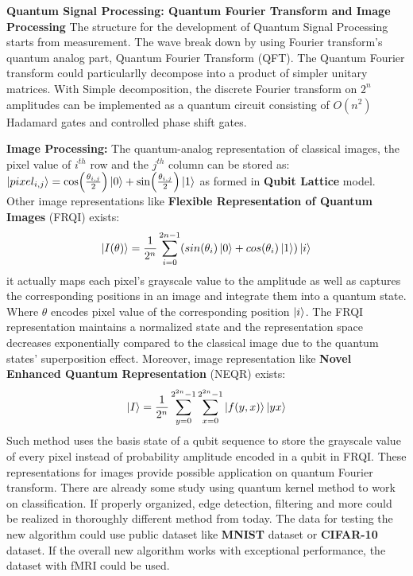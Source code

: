 \documentclass{article}
\begin{document}
\textbf{Quantum Signal Processing: Quantum Fourier Transform and Image Processing}\newline
The structure for the development of Quantum Signal Processing starts from
measurement. The wave break down by using Fourier transform's quantum analog
part, Quantum Fourier Transform (QFT). The Quantum Fourier transform could
particularlly decompose into a product of simpler unitary matrices.
With Simple decomposition, the discrete Fourier transform on $2^n$ amplitudes
can be implemented as a quantum circuit consisting of $O(n^2)$ Hadamard
gates and controlled phase shift gates. 


\textbf{Image Processing:} The quantum-analog representation of classical images, the pixel value 
of $i^{th}$ row and the $j^{th}$ column can be stored as:
$\ket{pixel_{i,j}} = \cos(\frac{\theta_{i,j}}{2}) \ket{0} + 
\sin (\frac{\theta_{i,j}}{2}) \ket{1}$ as formed in \textbf{Qubit Lattice} model.
Other image representations like \textbf{Flexible Representation of 
Quantum Images} (FRQI) exists: 
\begin{equation}
  \ket{I(\theta)} = \frac{1}{2^n} \sum_{i=0}^{2n-1} (sin(\theta_i) \ket{0} + cos(\theta_i)\ket{1}) \ket{i}
\end{equation}
it actually maps each pixel's grayscale value to the amplitude as well as 
captures the corresponding positions in an image and integrate them into 
a quantum state. Where $\theta$ encodes pixel value of the corresponding 
position $\ket{i}$. The FRQI representation maintains a normalized state 
and the representation space decreases exponentially compared to the 
classical image due to the quantum states' superposition effect. 
Moreover, image representation like \textbf{Novel Enhanced Quantum Representation} (NEQR) exists:
\begin{equation}
  \ket{I} = \frac{1}{2^n} \sum^{2^{2n} -1 }_{y=0} \sum^{2^{2n} -1 }_{x=0} \ket{f(y,x)} \ket{y x}
\end{equation}
Such method uses the basis state of a qubit sequence to 
store the grayscale value of every pixel instead of 
probability amplitude encoded in a qubit in FRQI. 
These representations for images provide possible application on 
quantum Fourier transform. There are already some study using quantum kernel 
method to work on classification. If properly organized, edge detection, filtering 
and more could be realized in thoroughly different method from today. The 
data for testing the new algorithm could use public dataset like 
\textbf{MNIST} dataset or \textbf{CIFAR-10} dataset. If the 
overall new algorithm works with exceptional performance, the 
dataset with fMRI could be used. 
\end{document}
